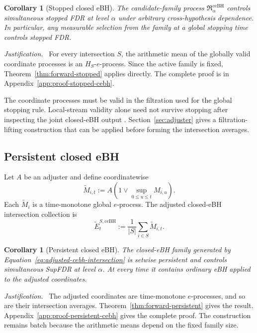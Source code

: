 \documentclass[11pt]{article}
\numberwithin{equation}{section}
\theoremstyle{plain}
\newtheorem{corollary}[theorem]{Corollary}
\theoremstyle{definition}
\newcommand{\Rfam}{\mathfrak R}
\newcommand{\ceBH}{\mathrm{ceBH}}
\newcommand{\justification}{\par\medskip\noindent\textit{Justification.}\ }
\begin{document}
\begin{corollary}[Stopped closed eBH]\label{cor:stopped-cebh}
The candidate-family process $\Rfam_\alpha^{\ceBH}$ controls simultaneous stopped FDR at level $\alpha$ under arbitrary cross-hypothesis dependence. In particular, any measurable selection from the family at a global stopping time controls stopped FDR.
\end{corollary}

\justification
For every intersection $S$, the arithmetic mean of the globally valid coordinate processes is an $H_S$-$e$-process. Since the active family is fixed, Theorem~\ref{thm:forward-stopped} applies directly. The complete proof is in Appendix~\ref{app:proof-stopped-cebh}.

The coordinate processes must be valid in the filtration used for the global stopping rule. Local-stream validity alone need not survive stopping after inspecting the joint closed-eBH output \citep{WangDandapanthulaRamdas2025}. Section~\ref{sec:adjuster} gives a filtration-lifting construction that can be applied before forming the intersection averages.

\subsection{Persistent closed eBH}\label{sec:persistent-cebh}

Let $A$ be an adjuster and define coordinatewise
\begin{equation}\label{eq:adjusted-coordinate}
  \widetilde M_{i,t}
  :=A\!\left(1\vee\sup_{0\leq u\leq t}M_{i,u}\right).
\end{equation}
Each $\widetilde M_i$ is a time-monotone global $e$-process. The adjusted closed-eBH intersection collection is
\begin{equation}\label{eq:adjusted-cebh-intersection}
  \widetilde E_t^{S,\ceBH}
  :=\frac1{|S|}\sum_{i\in S}\widetilde M_{i,t}.
\end{equation}

\begin{corollary}[Persistent closed eBH]\label{cor:persistent-cebh}
The closed-eBH family generated by Equation~\eqref{eq:adjusted-cebh-intersection} is setwise persistent and controls simultaneous SupFDR at level $\alpha$. At every time it contains ordinary eBH applied to the adjusted coordinates.
\end{corollary}

\justification
The adjusted coordinates are time-monotone $e$-processes, and so are their intersection averages. Theorem~\ref{thm:forward-persistent} gives the result. Appendix~\ref{app:proof-persistent-cebh} gives the complete proof. The construction remains batch because the arithmetic means depend on the fixed family size.
\end{document}
